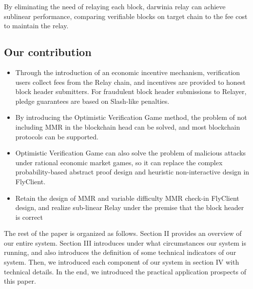 By eliminating the need of relaying each block, darwinia relay can achieve sublinear performance, comparing verifiable blocks on target chain to the fee cost to maintain the relay.

\subsection*{Our contribution}

\begin{itemize}
  \item Through the introduction of an economic incentive mechanism, verification users collect fees from the Relay chain, and incentives are provided to honest block header submitters. For fraudulent block header submissions to Relayer, pledge guarantees are based on Slash-like penalties.
  \item By introducing the Optimistic Verification Game method, the problem of not including MMR in the blockchain head can be solved, and most blockchain protocols can be supported.
  \item Optimistic Verification Game can also solve the problem of malicious attacks under rational economic market games, so it can replace the complex probability-based abstract proof design and heuristic non-interactive design in FlyClient.
  \item Retain the design of MMR and variable difficulty MMR check-in FlyClient design, and realize sub-linear Relay under the premise that the block header is correct
\end{itemize}

The rest of the paper is organized as follows. Section II provides an overview of our entire system. Section III introduces under what circumstances our system is running, and also introduces the definition of some technical indicators of our system. Then, we introduced each component of our system  in section IV with technical details. In the end, we introduced the practical application prospects of this paper.

